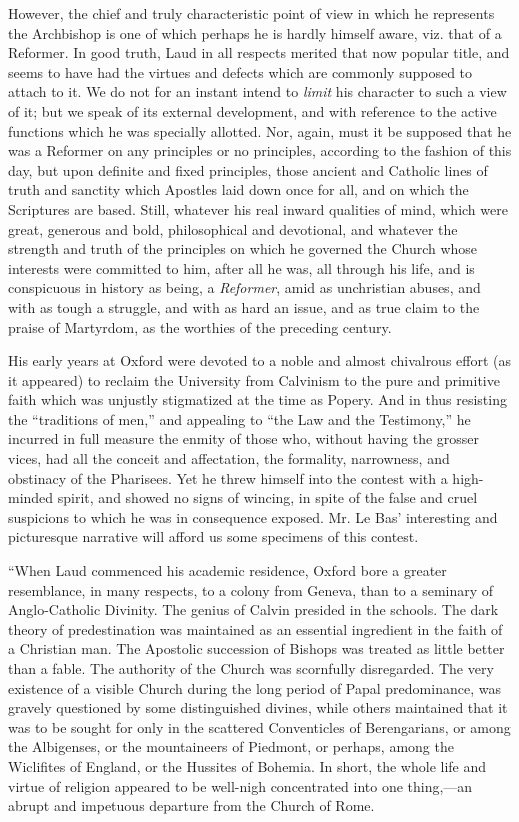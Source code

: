 However, the chief and truly characteristic point
of view in which he represents the Archbishop is one of which perhaps he
is hardly himself aware, viz. that of a Reformer. In good truth, Laud in
all respects merited that now popular title, and seems to have had the
virtues and defects which are commonly supposed to attach to it. We do
not for an instant intend to \emph{limit} his character to such a view
of it; but we speak of its external development, and with reference to
the active functions which he was specially allotted. Nor, again, must
it be supposed that he was a Reformer on any principles or no
principles, according to the fashion of this day, but upon definite and
fixed principles, those ancient and Catholic lines of truth and sanctity
which Apostles laid down once for all, and on which the Scriptures are
based. Still, whatever his real inward qualities of mind, which were
great, generous and bold, philosophical and devotional, and whatever the
strength and truth of the principles on which he governed the Church
whose interests were committed to him, after all he was, all through his
life, and is conspicuous in history as being, a \emph{Reformer}, amid as unchristian abuses, and with as tough a struggle, and with as
hard an issue, and as true claim to the praise of Martyrdom, as the
worthies of the preceding century.

His early years at Oxford were devoted to a noble
and almost chivalrous effort (as it appeared) to reclaim the University
from Calvinism to the pure and primitive faith which was unjustly
stigmatized at the time as Popery. And in thus resisting the ``traditions
of men,'' and appealing to ``the Law and the Testimony,'' he incurred in
full measure the enmity of those who, without having the grosser vices,
had all the conceit and affectation, the formality, narrowness, and
obstinacy of the Pharisees. Yet he threw himself into the contest with a
high-minded spirit, and showed no signs of wincing, in spite of the
false and cruel suspicions to which he was in consequence exposed. Mr.
Le Bas' interesting and picturesque narrative will afford us some
specimens of this contest.

``When Laud commenced his academic
residence, Oxford bore a greater resemblance, in many respects, to a
colony from Geneva, than to a seminary of Anglo-Catholic Divinity. The
genius of Calvin presided in the schools. The dark theory of
predestination was maintained as an essential ingredient in the faith of
a Christian man. The Apostolic succession of Bishops was treated as
little better than a fable. The authority of the Church was scornfully
disregarded. The very existence of a visible Church during the long
period of Papal predominance, was gravely questioned by some
distinguished divines, while others maintained that it was to be sought
for only in the scattered Conventicles of Berengarians, or among the
Albigenses, or the mountaineers of Piedmont, or perhaps, among the
Wiclifites of England, or the Hussites of Bohemia. In short, the whole
life and virtue of religion appeared to be well-nigh concentrated into
one thing,—an abrupt and impetuous departure from the Church of Rome.

